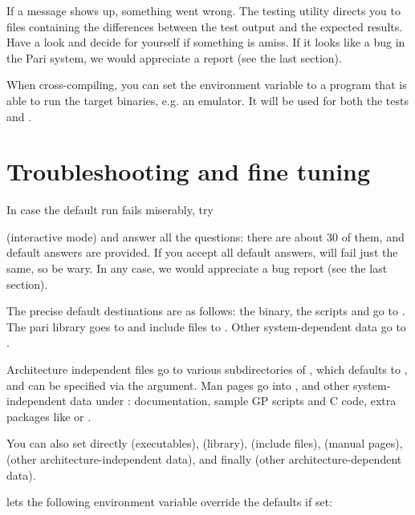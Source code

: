 If a \kbd{[BUG]} message shows up, something went wrong. The testing utility
directs you to files containing the differences between the test output and
the expected results. Have a look and decide for yourself if something is
amiss. If it looks like a bug in the Pari system, we would appreciate a
report (see the last section).


When cross-compiling, you can set the environment variable  to a
program that is able to run the target binaries, e.g. an emulator. It will be
used for both the  tests and .

\section{Troubleshooting and fine tuning}
In case the default  run fails miserably, try


\noindent (interactive mode) and answer all the questions: there are about 30
of them, and default answers are provided. If you accept all default answers,
 will fail just the same, so be wary. In any case, we would
appreciate a bug report (see the last section).

 The precise default destinations are as
follows: the  binary, the scripts  and  go
to . The pari library goes to  and
include files to . Other system-dependent data go
to .

Architecture independent files go to various subdirectories of
, which defaults to , and can be
specified via the  argument. Man pages go into
, and other system-independent data
under : documentation,
sample GP scripts and C code, extra packages like  or
.

\noindent You can also set directly  (executables),
 (library),  (include files), 
(manual pages),  (other architecture-independent data), and
finally  (other architecture-dependent data).

  lets the following environment
variable override the defaults if set:

